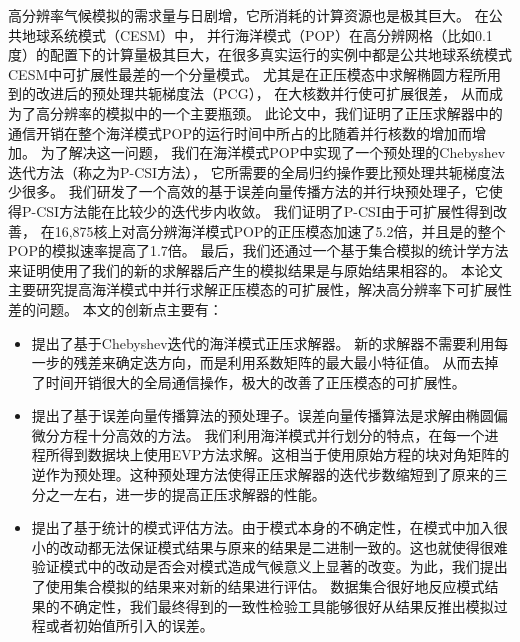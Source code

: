 \begin{cabstract}
高分辨率气候模拟的需求量与日剧增，它所消耗的计算资源也是极其巨大。 
  在公共地球系统模式（CESM）中， 并行海洋模式（POP）在高分辨网格（比如0.1度）的配置下的计算量极其巨大，在很多真实运行的实例中都是公共地球系统模式CESM中可扩展性最差的一个分量模式。 
  尤其是在正压模态中求解椭圆方程所用到的改进后的预处理共轭梯度法（PCG）， 在大核数并行使可扩展很差， 从而成为了高分辨率的模拟中的一个主要瓶颈。 
  此论文中，我们证明了正压求解器中的通信开销在整个海洋模式POP的运行时间中所占的比随着并行核数的增加而增加。 
  为了解决这一问题， 我们在海洋模式POP中实现了一个预处理的Chebyshev迭代方法（称之为P-CSI方法）， 它所需要的全局归约操作要比预处理共轭梯度法少很多。 
  我们研发了一个高效的基于误差向量传播方法的并行块预处理子，它使得P-CSI方法能在比较少的迭代步内收敛。 
  我们证明了P-CSI由于可扩展性得到改善， 在16,875核上对高分辨海洋模式POP的正压模态加速了5.2倍，并且是的整个POP的模拟速率提高了1.7倍。 
  最后，我们还通过一个基于集合模拟的统计学方法来证明使用了我们的新的求解器后产生的模拟结果是与原始结果相容的。
本论文主要研究提高海洋模式中并行求解正压模态的可扩展性，解决高分辨率下可扩展性差的问题。 
  本文的创新点主要有：
  \begin{itemize}
    \item 提出了基于Chebyshev迭代的海洋模式正压求解器。 新的求解器不需要利用每一步的残差来确定迭方向，而是利用系数矩阵的最大最小特征值。
    从而去掉了时间开销很大的全局通信操作，极大的改善了正压模态的可扩展性。
    \item 提出了基于误差向量传播算法的预处理子。误差向量传播算法是求解由椭圆偏微分方程十分高效的方法。
    我们利用海洋模式并行划分的特点，在每一个进程所得到数据块上使用EVP方法求解。这相当于使用原始方程的块对角矩阵的逆作为预处理。这种预处理方法使得正压求解器的迭代步数缩短到了原来的三分之一左右，进一步的提高正压求解器的性能。
    \item 提出了基于统计的模式评估方法。由于模式本身的不确定性，在模式中加入很小的改动都无法保证模式结果与原来的结果是二进制一致的。这也就使得很难验证模式中的改动是否会对模式造成气候意义上显著的改变。为此，我们提出了使用集合模拟的结果来对新的结果进行评估。 数据集合很好地反应模式结果的不确定性，我们最终得到的一致性检验工具能够很好从结果反推出模拟过程或者初始值所引入的误差。  
  \end{itemize}

\end{cabstract}


